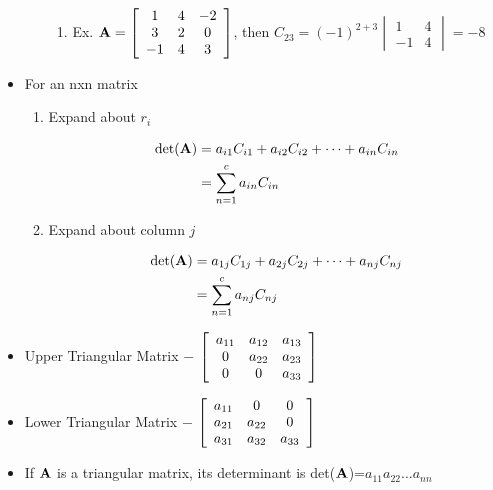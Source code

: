\documentclass[12pt]{article}
\begin{document}
\begin{itemize}
\begin{enumerate}
\begin{enumerate}
      \item Ex. $\bold{A}=\left[ \begin{array}{c c c} 1 & 4 & -2\\ 3 & 2 & 0\\ -1 & 4 & 3\\ \end{array}\right]$, then $C_{23}=(-1)^{2+3}\begin{vmatrix} 1 & 4\\ -1 & 4 \end{vmatrix}=-8$

    \end{enumerate}

    \end{enumerate}

  \item For an nxn matrix

    \begin{enumerate}

      \item Expand about $r_i$

        \begin{equation}
          \begin{split}
          \text{det}(\bold{A})&=a_{i1}C_{i1}+a_{i2}C_{i2}+\dots+a_{in}C_{in}\\
          &= \sum_{n=1}^c a_{in}C_{in}
        \end{split}
          \label{1}
        \end{equation}

      \item Expand about column $j$

        \begin{equation}
          \begin{split}
          \text{det}(\bold{A})&=a_{1j}C_{1j}+a_{2j}C_{2j}+\dots+a_{nj}C_{nj}\\
          &= \sum_{n=1}^c a_{nj}C_{nj}
        \end{split}
          \label{2}
        \end{equation}

    \end{enumerate}

  \item Upper Triangular Matrix $-$ $\left[ \begin{array}{c c c} a_{11} & a_{12} & a_{13} \\ 0 & a_{22} & a_{23}\\ 0 & 0 & a_{33}  \end{array} \right]$

  \item Lower Triangular Matrix $-$ $\left[ \begin{array}{c c c} a_{11} & 0 & 0\\ a_{21} & a_{22} & 0\\ a_{31} & a_{32} & a_{33}  \end{array} \right]$ 

  \item If $\bold{A}$ is a triangular matrix, its determinant is det($\bold{A}$)=$a_{11}a_{22}\dots a_{nn}$

\end{itemize}
\end{document}
